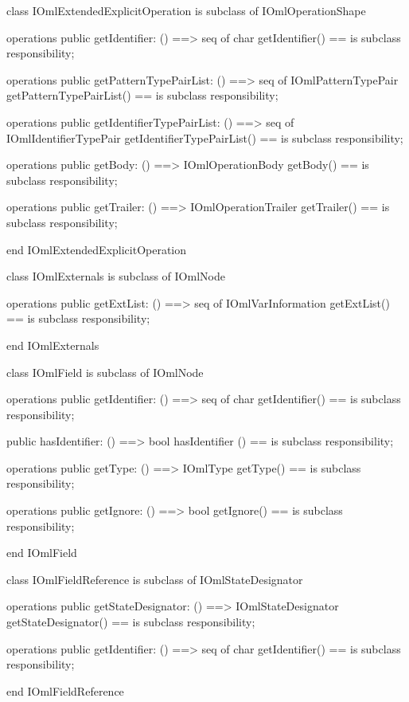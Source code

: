 \begin{vdm_al}
class IOmlExtendedExplicitOperation
 is subclass of IOmlOperationShape

operations
  public getIdentifier: () ==> seq of char
  getIdentifier() == is subclass responsibility;

operations
  public getPatternTypePairList: () ==> seq of IOmlPatternTypePair
  getPatternTypePairList() == is subclass responsibility;

operations
  public getIdentifierTypePairList: () ==> seq of IOmlIdentifierTypePair
  getIdentifierTypePairList() == is subclass responsibility;

operations
  public getBody: () ==> IOmlOperationBody
  getBody() == is subclass responsibility;

operations
  public getTrailer: () ==> IOmlOperationTrailer
  getTrailer() == is subclass responsibility;

end IOmlExtendedExplicitOperation
\end{vdm_al}

\begin{vdm_al}
class IOmlExternals
 is subclass of IOmlNode

operations
  public getExtList: () ==> seq of IOmlVarInformation
  getExtList() == is subclass responsibility;

end IOmlExternals
\end{vdm_al}

\begin{vdm_al}
class IOmlField
 is subclass of IOmlNode

operations
  public getIdentifier: () ==> seq of char
  getIdentifier() == is subclass responsibility;

  public hasIdentifier: () ==> bool
  hasIdentifier () == is subclass responsibility;

operations
  public getType: () ==> IOmlType
  getType() == is subclass responsibility;

operations
  public getIgnore: () ==> bool
  getIgnore() == is subclass responsibility;

end IOmlField
\end{vdm_al}

\begin{vdm_al}
class IOmlFieldReference
 is subclass of IOmlStateDesignator

operations
  public getStateDesignator: () ==> IOmlStateDesignator
  getStateDesignator() == is subclass responsibility;

operations
  public getIdentifier: () ==> seq of char
  getIdentifier() == is subclass responsibility;

end IOmlFieldReference
\end{vdm_al}

